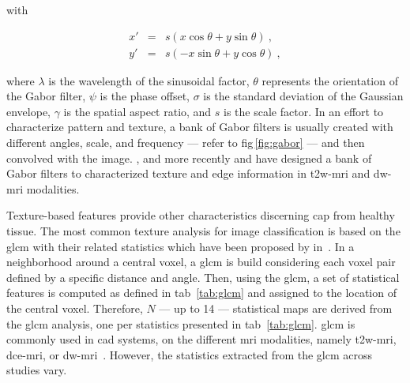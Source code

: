 \noindent with 

\begin{eqnarray}
	x' & = & s\left( x \cos \theta + y \sin \theta \right) \ , \nonumber \\
	y' & = & s \left( - x \sin \theta + y \cos \theta \right) \ , \nonumber
\end{eqnarray}

\noindent where $\lambda$ is the wavelength of the sinusoidal factor, $\theta$ represents the orientation of the Gabor filter, $\psi$ is the phase offset, $\sigma$ is the standard deviation of the Gaussian envelope, $\gamma$ is the spatial aspect ratio, and $s$ is the scale factor.
In an effort to characterize pattern and texture, a bank of Gabor filters is usually created with different angles, scale, and frequency --- refer to \acs{fig}\,\ref{fig:gabor} --- and then convolved with the image.
\citeauthor{Viswanath2012}, \citeauthor{Tiwari2012} and more recently \citeauthor{khalvati2015automated} and \citeauthor{chung2015prostate} have designed a bank of Gabor filters to characterized texture and edge information in \ac{t2w}-\ac{mri} and \ac{dw}-\ac{mri} modalities.

Texture-based features provide other characteristics discerning \ac{cap} from healthy tissue.
The most common texture analysis for image classification is based on the \ac{glcm} with their related statistics which have been proposed by \citeauthor{Haralick1973} in~\cite{Haralick1973}.
In a neighborhood around a central voxel, a \ac{glcm} is build considering each voxel pair defined by a specific distance and angle.
Then, using the \ac{glcm}, a set of statistical features is computed as defined in \acs{tab}~\ref{tab:glcm} and assigned to the location of the central voxel.
Therefore, $N$ --- up to 14 --- statistical maps are derived from the \ac{glcm} analysis, one per statistics presented in \acs{tab}~\ref{tab:glcm}.
\ac{glcm} is commonly used in \ac{cad} systems, on the different \ac{mri} modalities, namely \ac{t2w}-\ac{mri}, \ac{dce}-\ac{mri}, or \ac{dw}-\ac{mri}~\cite{Antic2013,Niaf2011,Niaf2012,Tiwari2009a,Tiwari2010,Tiwari2013,Viswanath2008,Viswanath2009,Viswanath2011,Viswanath2012,trigui2016classification,rampun2015computer,rampun2016computer,rampun2016quantitative,cameron2014multiparametric,cameron2016maps,khalvati2015automated,chung2015prostate,lehaire2014computer}.
However, the statistics extracted from the \ac{glcm} across studies vary.


